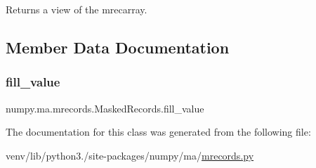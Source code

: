 \begin{DoxyVerb}Returns a view of the mrecarray.\end{DoxyVerb}
 

\subsection{Member Data Documentation}
\mbox{\label{classnumpy_1_1ma_1_1mrecords_1_1MaskedRecords_af679e8a301f29d0593d47399cce90bc9}} 
\subsubsection{\texorpdfstring{fill\+\_\+value}{fill\_value}}
{\footnotesize\ttfamily numpy.\+ma.\+mrecords.\+Masked\+Records.\+fill\+\_\+value}



The documentation for this class was generated from the following file\+:\begin{DoxyCompactItemize}
\item 
venv/lib/python3./site-\/packages/numpy/ma/\hyperlink{mrecords_8py}{mrecords.\+py}\end{DoxyCompactItemize}
